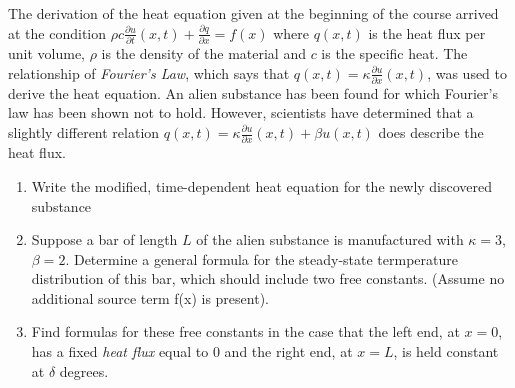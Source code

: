 
The derivation of the heat equation given at the beginning of the course arrived at the condition $\rho c \frac{\partial u}{\partial t} (x,t) + \frac{\partial q}{\partial x} = f(x)$ where $q(x,t)$ is the heat flux per unit volume, $\rho$ is the density of the material and $c$ is the specific heat.  The relationship of \textit{Fourier's Law}, which says that $q(x,t) = \kappa \frac{\partial u}{\partial x}(x,t)$, was used to derive the heat equation.  An alien substance has been found for which Fourier's law has been shown not to hold.  However, scientists have determined that a slightly different relation $q(x,t) = \kappa\frac{\partial u}{\partial x}(x,t) + \beta u(x,t)$ does describe the heat flux.


\begin{enumerate}
\item Write the modified, time-dependent heat equation for the newly discovered substance

\item Suppose a bar of length $L$ of the alien substance is manufactured with $\kappa = 3$, $\beta = 2$.  Determine a general formula for the steady-state termperature distribution of this bar, which should include two free constants.  (Assume no additional source term f(x) is present).

\item Find formulas for these free constants in the case that the left end, at $x=0$, has a fixed \textit{heat flux} equal to $0$ and the right end, at $x=L$, is held constant at $\delta$ degrees.

%
%

\end{enumerate}